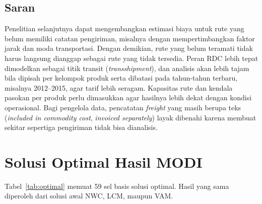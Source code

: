 \documentclass[a4paper,11pt]{article}
\begin{document}
\subsection{Saran}
Penelitian selanjutnya dapat mengembangkan estimasi biaya untuk rute yang belum memiliki catatan pengiriman, misalnya dengan mempertimbangkan faktor jarak dan moda transportasi. Dengan demikian, rute yang belum teramati tidak harus langsung dianggap sebagai rute yang tidak tersedia. Peran RDC lebih tepat dimodelkan sebagai titik transit (\textit{transshipment}), dan analisis akan lebih tajam bila dipisah per kelompok produk serta dibatasi pada tahun-tahun terbaru, misalnya 2012--2015, agar tarif lebih seragam. Kapasitas rute dan kendala pasokan per produk perlu dimasukkan agar hasilnya lebih dekat dengan kondisi operasional. Bagi pengelola data, pencatatan \textit{freight} yang masih berupa teks (\textit{included in commodity cost}, \textit{invoiced separately}) layak dibenahi karena membuat sekitar sepertiga pengiriman tidak bisa dianalisis.

\appendix
\section{Solusi Optimal Hasil MODI}\label{app:A}
Tabel~\ref{tab:optimal} memuat 59 sel basis solusi optimal. Hasil yang sama diperoleh dari solusi awal NWC, LCM, maupun VAM.
\end{document}
